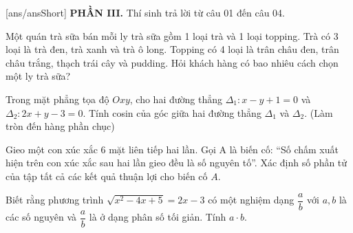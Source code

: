 
\setcounter{ex}{0}
[ans/ansShort]
\noindent\textbf{PHẦN III.} Thí sinh trả lời từ câu 01 đến câu 04.


\begin{ex}%
    Một quán trà sữa bán mỗi ly trà sữa gồm 1 loại trà và 1 loại topping. Trà có 3 loại là trà đen, trà xanh và trà ô long. Topping có 4 loại là trân châu đen, trân châu trắng, thạch trái cây và pudding. Hỏi khách hàng có bao nhiêu cách chọn một ly trà sữa?
\end{ex}

\begin{ex}%
Trong mặt phẳng tọa độ $Oxy$, cho hai đường thẳng 
$\Delta_1: x - y + 1 = 0$ và $\Delta_2: 2x + y - 3 = 0$. Tính cosin của góc giữa hai đường thẳng $\Delta_1$ và $\Delta_2$. (Làm tròn đến hàng phần chục)
\end{ex}

\begin{ex}%
Gieo một con xúc xắc 6 mặt liên tiếp hai lần. Gọi A là biến cố: ``Số chấm xuất hiện trên con xúc xắc sau hai lần gieo đều là số nguyên tố''. Xác định số phần tử của tập tất cả các kết quả thuận lợi cho biến cố $A$. 
\end{ex}

\begin{ex}%
Biết rằng phương trình 
$\sqrt{x^2 - 4x + 5} = 2x - 3$ 
có một nghiệm dạng $\dfrac{a}{b}$ với $a, b$ là các số nguyên và $\dfrac{a}{b}$ là ở dạng phân số tối giản. Tính $a \cdot b$. 
\end{ex}

